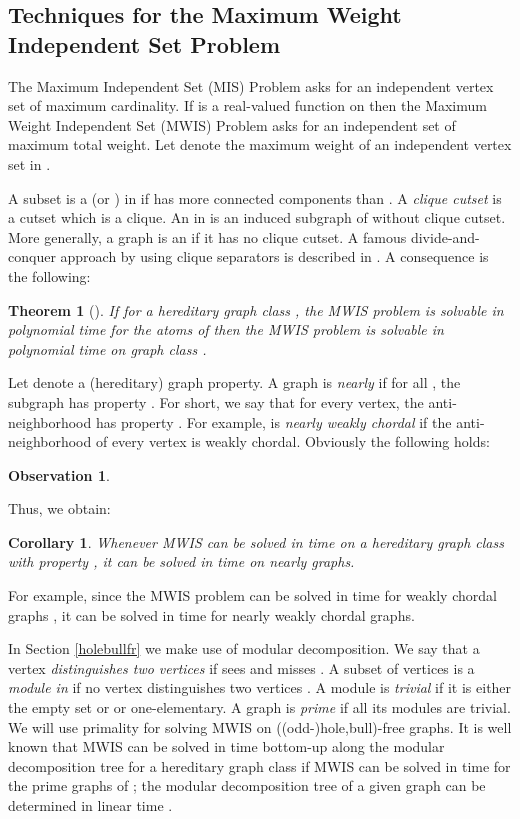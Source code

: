 \documentclass[11pt]{article}
\newcommand{\0}{\text{ has a co-join to }}
\newcommand{\1}{\text{ has a join to }}
\newtheorem{theo}{Theorem}
\newtheorem{coro}{Corollary}
\newtheorem{obse}{Observation}
\begin{document}
\subsection{Techniques for the Maximum Weight Independent Set Problem}
 
The Maximum Independent Set (MIS) Problem asks for an independent vertex set of maximum cardinality. If  is a real-valued function on  then the Maximum Weight Independent Set (MWIS) Problem asks for an independent set of maximum total weight. Let  denote the maximum weight of an independent vertex set in .

A subset  is a  (or ) in  if  has more connected components than . A {\em clique cutset} is a cutset which is a clique. An  in  is an induced subgraph of  without clique cutset. More generally, a graph is an  if it has no clique cutset. A famous divide-and-conquer approach by using clique separators is described in \cite{Tarjan1985,White1984}. A consequence is the following:

\begin{theo}[\cite{Tarjan1985,White1984}]\label{MWISatomred}
If for a hereditary graph class , the MWIS problem is solvable in polynomial time for the atoms of  then the MWIS problem is solvable in polynomial time on graph class .
\end{theo}

Let  denote a (hereditary) graph property. A graph  is {\em nearly } if for all , the subgraph  has property . For short, we say that for every vertex, the anti-neighborhood has property . For example,  is {\em nearly weakly chordal} if the anti-neighborhood of every vertex is weakly chordal. Obviously the following holds:

\begin{obse}

\end{obse}

Thus, we obtain: 

\begin{coro}\label{nearlyPiMWIS}
Whenever MWIS can be solved in time  on a hereditary graph class with property , it can be solved in time  on nearly  graphs. 
\end{coro}

For example, since the MWIS problem can be solved in time  for weakly chordal graphs \cite{SpiSri1995}, it can be solved in time  for nearly weakly chordal graphs.

In Section \ref{holebullfr} we make use of modular decomposition. We say that a vertex  {\em distinguishes two vertices } if  sees  and misses . A subset  of vertices is a {\em module in } if no vertex  distinguishes two vertices . A module is {\em trivial} if it is either the empty set or  or one-elementary. A graph is {\em prime} if all its modules are trivial. We will use primality for solving MWIS on ((odd-)hole,bull)-free graphs. It is well known that MWIS can be solved in time  bottom-up along the modular decomposition tree for a hereditary graph class  if MWIS can be solved in time  for the prime graphs of ; the modular decomposition tree of a given graph can be determined in linear time \cite{McCSpi1999}. 
    
\end{document}
